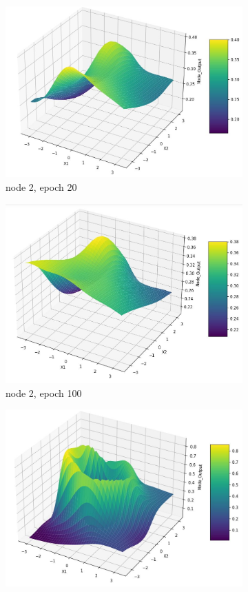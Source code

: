 \documentclass[11pt]{article}
\begin{document}
\begin{figure}[h!]
\begin{subfigure}[b]{0.30\textwidth}
	\includegraphics[scale=0.14]{output_n2_e20.jpg}
	\caption{node 2, epoch 20}
	\label{fig:fig2.1.3.8}
	\end{subfigure}
	\begin{subfigure}[b]{0.45\textwidth}
	\centering
	\includegraphics[scale=0.14]{output_n2_e100.jpg}
	\caption{node 2, epoch 100}
	\label{fig:fig2.1.3.9}
	\end{subfigure}
	\begin{subfigure}[b]{0.45\textwidth}
	\centering
	\includegraphics[scale=0.14]{output_n2_c.jpg}

\end{subfigure}
\end{figure}
\end{document}
